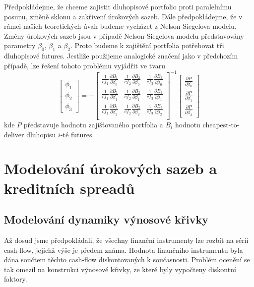 \documentclass[a4paper]{book}
\begin{document}
Předpokládejme, že chceme zajistit dluhopisové portfolio proti paralelnímu posunu, změně sklonu a zakřivení úrokových sazeb. Dále předpokládejme, že v rámci našich teoretických úvah budeme vycházet z Nelson-Siegelova modelu. Změny úrokových sazeb jsou v případě Nelson-Siegelova modelu představovány parametry $\beta_0$, $\beta_1$ a $\beta_2$. Proto budeme k zajištění portfolia potřebovat tři dluhopisové futures. Jestliže použijeme analogické značení jako v předchozím případě, lze řešení tohoto problému vyjádřit ve tvaru
\begin{equation*}
\begin{bmatrix}
\phi_1 \\
\phi_2 \\
\phi_3
\end{bmatrix}
= -
\begin{bmatrix}
\frac{1}{cf_1}\frac{\partial B_1}{\partial \beta_0} & \frac{1}{cf_2}\frac{\partial B_2}{\partial \beta_0} & \frac{1}{cf_3}\frac{\partial B_3}{\partial \beta_0} \\
\frac{1}{cf_1}\frac{\partial B_1}{\partial \beta_1} & \frac{1}{cf_2}\frac{\partial B_2}{\partial \beta_1} & \frac{1}{cf_3}\frac{\partial B_3}{\partial \beta_1} \\
\frac{1}{cf_1}\frac{\partial B_1}{\partial \beta_2} & \frac{1}{cf_2}\frac{\partial B_2}{\partial \beta_2} & \frac{1}{cf_3}\frac{\partial B_3}{\partial \beta_2} \\
\end{bmatrix}^{-1}
\begin{bmatrix}
\frac{\partial P}{\partial \beta_0} \\
\frac{\partial P}{\partial \beta_1} \\
\frac{\partial P}{\partial \beta_2}
\end{bmatrix}
\end{equation*}
kde $P$ představuje hodnotu zajišťovaného portfolia a $B_i$ hodnotu cheapest-to-deliver dluhopisu $i$-té futures.

\part{Modelování úrokových sazeb a kreditních spreadů}

\chapter{Modelování dynamiky výnosové křivky}

Až dosud jsme předpokládali, že všechny finanční instrumenty lze rozbít na sérii cash-flow, jejichž výše je předem známa. Hodnota finančního instrumentu byla dána součtem těchto cash-flow diskontovaných k současnosti. Problém ocenění se tak omezil na konstrukci výnosové křivky, ze které byly vypočteny diskontní faktory.
\end{document}

